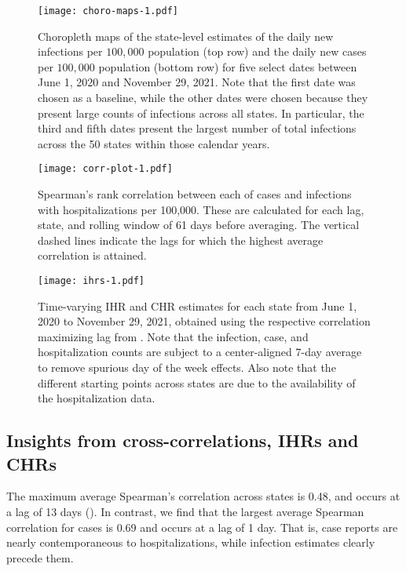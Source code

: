 \begin{figure}[H]
\centering
\texttt{[image: choro-maps-1.pdf]}
\caption{Choropleth maps of the state-level estimates of the daily new
infections per $100,000$ population (top row) and the daily new cases per
$100,000$ population (bottom row) for five select dates between June 1, 2020 and
November 29, 2021. Note that the first date was chosen as a baseline, while the
other dates were chosen because they present large counts of infections across
all states. In particular, the third and fifth dates present the largest number
of total infections across the 50 states within those calendar years.} %
\label{fig:choro_inf_case_rates}
\end{figure}    

\begin{figure}[H]
\centering
\texttt{[image: corr-plot-1.pdf]} 
\caption{Spearman's rank correlation between each of cases and
infections with hospitalizations per 100,000. These are calculated for each lag,
state, and rolling window of 61 days before averaging. The vertical dashed lines
indicate the lags for which the highest average correlation is attained.}
\label{fig:correlations}
\end{figure}

\begin{figure}[H]
\centering
\texttt{[image: ihrs-1.pdf]}
\caption{Time-varying IHR and CHR estimates for each state from June 1, 2020 to
November 29, 2021, obtained using the respective correlation maximizing lag from
. Note that the infection, case, and
hospitalization counts are subject to a center-aligned 7-day average to remove
spurious day of the week effects. Also note that the different starting points
across states are due to the availability of the hospitalization data.}
\label{fig:IHR_7dav}
\end{figure} 

\subsection{Insights from cross-correlations, IHRs and CHRs}
\label{sec:lagged-correlations}

The maximum average Spearman's correlation across states is
0.48, and occurs at a lag of 13 days (). In contrast, we find that the largest
average Spearman correlation for cases is 0.69 and occurs at a lag of 1 day.
That is, case reports are nearly contemporaneous to hospitalizations, while
infection estimates clearly precede them. 

